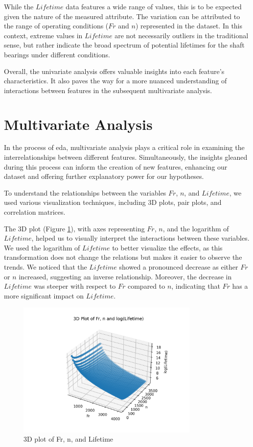 While the \(Lifetime\) data features a wide range of values, this is to be expected given the nature of the measured attribute. The variation can be attributed to the range of operating conditions (\(Fr\) and \(n\)) represented in the dataset. In this context, extreme values in \(Lifetime\) are not necessarily outliers in the traditional sense, but rather indicate the broad spectrum of potential lifetimes for the shaft bearings under different conditions.

Overall, the univariate analysis offers valuable insights into each feature's characteristics. It also paves the way for a more nuanced understanding of interactions between features in the subsequent multivariate analysis.


\section{Multivariate Analysis}

In the process of \ac{eda}, multivariate analysis plays a critical role in examining the interrelationships between different features. Simultaneously, the insights gleaned during this process can inform the creation of new features, enhancing our dataset and offering further explanatory power for our hypotheses.

To understand the relationships between the variables \(Fr\), \(n\), and \(Lifetime\), we used various visualization techniques, including 3D plots, pair plots, and correlation matrices.

The 3D plot (Figure \ref{fig:bearings-3dplot}), with axes representing \(Fr\), \(n\), and the logarithm of \(Lifetime\), helped us to visually interpret the interactions between these variables. We used the logarithm of \(Lifetime\) to better visualize the effects, as this transformation does not change the relations but makes it easier to observe the trends. We noticed that the \(Lifetime\) showed a pronounced decrease as either \(Fr\) or \(n\) increased, suggesting an inverse relationship. Moreover, the decrease in \(Lifetime\) was steeper with respect to \(Fr\) compared to \(n\), indicating that \(Fr\) has a more significant impact on \(Lifetime\).

\begin{figure}[h]
    \centering
    \includegraphics[width=0.8\textwidth]{assets/bearings-eda/3dplot-log.png}
    \caption{3D plot of Fr, n, and Lifetime}
    \label{fig:bearings-3dplot}
\end{figure}

